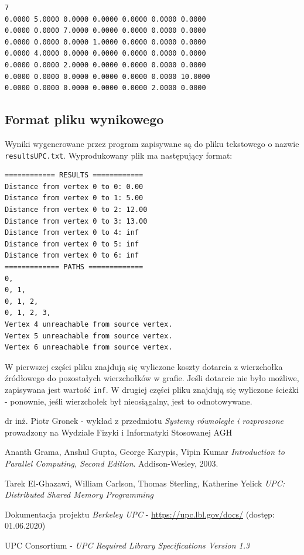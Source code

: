\documentclass[12pt]{article}
\begin{document}
\begin{lstlisting}[caption={Przykładowy plik wejściowy.}]
7
0.0000 5.0000 0.0000 0.0000 0.0000 0.0000 0.0000
0.0000 0.0000 7.0000 0.0000 0.0000 0.0000 0.0000
0.0000 0.0000 0.0000 1.0000 0.0000 0.0000 0.0000
0.0000 4.0000 0.0000 0.0000 0.0000 0.0000 0.0000
0.0000 0.0000 2.0000 0.0000 0.0000 0.0000 0.0000
0.0000 0.0000 0.0000 0.0000 0.0000 0.0000 10.0000
0.0000 0.0000 0.0000 0.0000 0.0000 2.0000 0.0000
\end{lstlisting}


\subsection{Format pliku wynikowego}
Wyniki wygenerowane przez program zapisywane są do pliku tekstowego o nazwie \lstinline{resultsUPC.txt}. Wyprodukowany plik ma następujący format:
\begin{lstlisting}[caption={Przykładowy plik z wynikami}]
============ RESULTS ============
Distance from vertex 0 to 0: 0.00 
Distance from vertex 0 to 1: 5.00 
Distance from vertex 0 to 2: 12.00 
Distance from vertex 0 to 3: 13.00 
Distance from vertex 0 to 4: inf 
Distance from vertex 0 to 5: inf 
Distance from vertex 0 to 6: inf 
============= PATHS =============
0, 
0, 1, 
0, 1, 2, 
0, 1, 2, 3, 
Vertex 4 unreachable from source vertex.
Vertex 5 unreachable from source vertex.
Vertex 6 unreachable from source vertex.
\end{lstlisting}
W pierwszej części pliku znajdują się wyliczone koszty dotarcia z wierzchołka źródłowego do pozostałych wierzchołków w grafie. Jeśli dotarcie nie było możliwe, zapisywana jest wartość \lstinline{inf}. W drugiej części pliku znajdują się wyliczone ścieżki - ponownie, jeśli wierzchołek był nieosiągalny, jest to odnotowywane.

\begin{thebibliography}{9}

dr inż. Piotr Gronek - wykład z przedmiotu \textit{Systemy równoległe i rozproszone} prowadzony na Wydziale Fizyki i Informatyki Stosowanej AGH

Ananth Grama, Anshul Gupta, George Karypis, Vipin Kumar 
\textit{Introduction to Parallel Computing, Second Edition}. 
Addison-Wesley, 2003.

Tarek El-Ghazawi, William Carlson, Thomas Sterling, Katherine Yelick 
\textit{UPC: Distributed Shared Memory Programming}

Dokumentacja projektu \textit{Berkeley UPC} - \url{https://upc.lbl.gov/docs/} (dostęp: 01.06.2020)

UPC Consortium - \textit{UPC Required Library Specifications Version 1.3}



\end{thebibliography}
\end{document}
